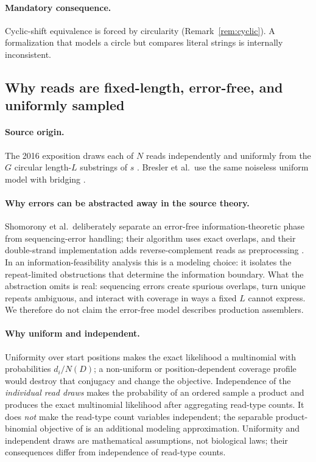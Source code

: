 \paragraph{Mandatory consequence.}
Cyclic-shift equivalence is forced by circularity (Remark~\ref{rem:cyclic}).
A formalization that models a circle but compares literal strings is internally
inconsistent.

\subsection{Why reads are fixed-length, error-free, and uniformly sampled}

\paragraph{Source origin.}
The 2016 exposition draws each of $N$ reads independently and uniformly from the
$G$ circular length-$L$ substrings of $s$ \parencite[\S2]{shomorony2016}. Bresler et
al.\ use the same noiseless uniform model with bridging \parencite{bresler2013}.

\paragraph{Why errors can be abstracted away in the source theory.}
Shomorony et al.\ deliberately separate an error-free information-theoretic phase
from sequencing-error handling; their algorithm uses exact overlaps, and their
double-strand implementation adds reverse-complement reads as preprocessing
\parencite[\S4.1]{shomorony2016}. In an information-feasibility analysis this is a
modeling choice: it isolates the repeat-limited obstructions that determine the
information boundary. What the abstraction omits is real: sequencing errors
create spurious overlaps, turn unique repeats ambiguous, and interact with
coverage in ways a fixed $L$ cannot express. We therefore do not claim the
error-free model describes production assemblers.

\paragraph{Why uniform and independent.}
Uniformity over start positions makes the exact likelihood a multinomial with
probabilities $d_i/N(D)$; a non-uniform or position-dependent coverage profile
would destroy that conjugacy and change the objective. Independence of the \emph{individual read draws} makes the probability of an
ordered sample a product and produces the exact multinomial likelihood after
aggregating read-type counts. It does \emph{not} make the read-type count
variables independent; the separable product-binomial objective of
\parencite[\S6.1]{medvedev2009} is an additional modeling approximation.
Uniformity and independent draws are mathematical assumptions, not biological
laws; their consequences differ from independence of read-type counts.

